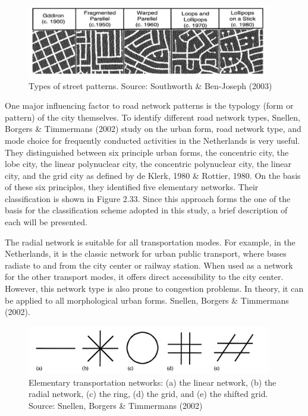 \begin{figure}[h]
\centering
\includegraphics[width=0.95\textwidth,center]{picture/figure2.png}
\caption[Types of Street Patterns]{Types of street patterns. Source: Southworth \& Ben-Joseph (2003)}
\label{fig:streetpatterns}
\end{figure}

One major influencing factor to road network patterns is the typology (form or pattern) of the city themselves. To identify different road network types, Snellen, Borgers \& Timmermans (2002) study on the urban form, road network type, and mode choice for frequently conducted activities in the Netherlands is very useful. They distinguished between six principle urban forms, the concentric city, the lobe city, the linear polynuclear city, the concentric polynuclear city, the linear city, and the grid city as defined by de Klerk, 1980 \& Rottier, 1980. On the basis of these six principles, they identified five elementary networks. Their classification is shown in Figure 2.33. Since this approach forms the one of the basis for the classification scheme adopted in this study, a brief description of each will be presented.

The radial network is suitable for all transportation modes. For example, in the Netherlands, it is the classic network for urban public transport, where buses radiate to and from the city center or railway station. When used as a network for the other transport modes, it offers direct accessibility to the city center. However, this network type is also prone to congestion problems. In theory, it can be applied to all morphological urban forms. Snellen, Borgers \& Timmermans (2002).

\begin{figure}[h]
\centering
\includegraphics[width=0.95\textwidth,center]{picture/figure3.png}
\caption[Elementary Transportation Networks]{Elementary transportation networks: (a) the linear network, (b) the radial network, (c) the ring, (d) the grid, and (e) the shifted grid.  Source: Snellen, Borgers \& Timmermans (2002)}
\label{fig:transportnetworks}
\end{figure}

